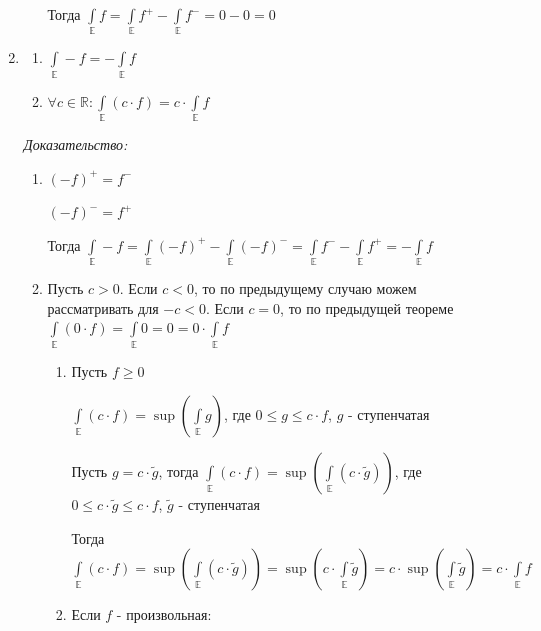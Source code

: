 \documentclass[paper=a4, fontsize=17pt]{article}
\begin{document}
\begin{enumerate}
\begin{enumerate}
		Тогда $\int\limits_\mathds{E} f = \int\limits_{\mathds{E}} f^+ - \int\limits_{\mathds{E}} f^- = 0 - 0 = 0$
	\end{enumerate}

	\item
	\begin{enumerate}
		\item
		$\int\limits_{\mathds{E}} -f = - \int\limits_{\mathds{E}} f$

		\item
		$\forall c \in \mathds{R}: \int\limits_{\mathds{E}} (c \cdot f) = c \cdot \int\limits_{\mathds{E}} f $
	\end{enumerate}

	\emph{Доказательство:}
	\begin{enumerate}
		\item
		$(-f)^+ = f^-$

		$(-f)^- = f^+$

		Тогда $\int\limits_{\mathds{E}} -f = \int\limits_{\mathds{E}} (-f)^+ - \int\limits_{\mathds{E}} (-f)^- = \int\limits_{\mathds{E}} f^- - \int\limits_{\mathds{E}} f^+ = -\int\limits_{\mathds{E}} f$

		\item

		Пусть $c > 0$. Если $c < 0$, то по предыдущему случаю можем рассматривать для $- c < 0$. Если $c = 0$, то по предыдущей теореме $\int\limits_{\mathds{E}} (0 \cdot f) = \int\limits_{\mathds{E}} 0 = 0 = 0 \cdot \int\limits_{\mathds{E}} f$

		\begin{enumerate}
			\item
			Пусть $f \geqslant 0$

			$\int\limits_{\mathds{E}} (c \cdot f) = \sup (\int\limits_{\mathds{E}} g)$, где $0 \leqslant g \leqslant c \cdot f$, $g$ - ступенчатая

			Пусть $g = c \cdot \widetilde{g}$, тогда $\int\limits_{\mathds{E}} (c \cdot f) = \sup (\int\limits_{\mathds{E}} (c \cdot \widetilde{g}))$, где $0 \leqslant c \cdot \widetilde{g} \leqslant c \cdot f$, $\widetilde{g}$ - ступенчатая

			Тогда $\int\limits_{\mathds{E}} (c \cdot f) = \sup (\int\limits_{\mathds{E}} (c \cdot \widetilde{g})) = \sup (c \cdot \int\limits_{\mathds{E}} \widetilde{g}) = c \cdot \sup (\int\limits_{\mathds{E}} \widetilde{g}) = c \cdot \int\limits_{\mathds{E}} f $

			\item Если $f$ - произвольная:


\end{enumerate}
\end{enumerate}
\end{enumerate}
\end{document}
